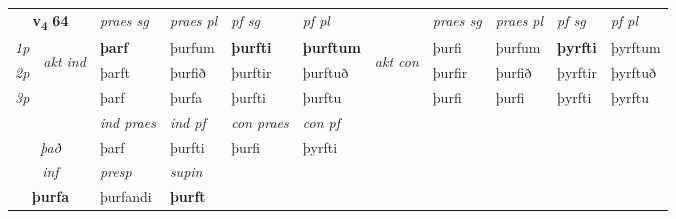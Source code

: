 \noindent
\begin{tabular}{lllllllllll} \toprule
\multicolumn{2}{c}{\textbf{v{\textsubscript{4}}} \Large{\textbf{64}}}  &  \textit{praes sg}  & \textit{praes pl}  &\textit{ pf sg} & \textit{pf pl} &  &  \textit{praes sg}  & \textit{praes pl}  & \textit{pf sg} & \textit{pf pl } \\*
	\cmidrule{3-6} \cmidrule{8-11}
 {\textit{1p}} & \multirow{3}{*}{\begin{turn}{90}\textit{akt ind}\end{turn}} & \textbf{þarf} & þurfum & \textbf{þurfti} & \textbf{þurftum} & \multirow{3}{*}{\begin{turn}{90}\textit{akt con}\end{turn}} &þurfi & þurfum & \textbf{þyrfti} & þyrftum\\*
 {\textit{2p}} &  &  þarft  & þurfið & þurftir & þurftuð & & þurfir & þurfið & þyrftir & þyrftuð \\*
{\textit{3p}} &  & þarf & þurfa & þurfti & þurftu & & þurfi & þurfi& þyrfti & þyrftu \\*
\cmidrule{3-6} \cmidrule{8-11}

   & &  \textit{ind praes} & \textit{ind pf} & \textit{con praes} & \textit{con pf} \\*
\multicolumn{2}{c}{ \textit{það} } & þarf & þurfti & þurfi & þyrfti \\*

\cmidrule{3-4}
   \multicolumn{2}{c}{\textit{inf}}     & \textit{presp} & \textit{supin}   \\*
  \multicolumn{2}{c}{\textbf{þurfa}}      & þurfandi &  \textbf{þurft}   \\*
\end{tabular}

